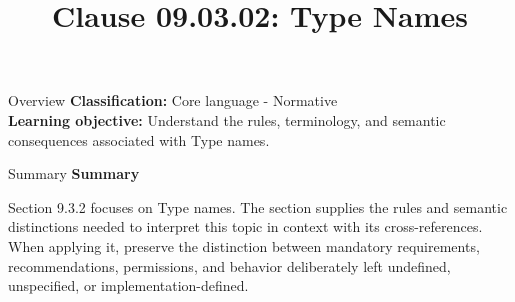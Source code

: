 \documentclass[10pt,letterpaper]{article}
\title{Clause 09.03.02: Type Names}
\author{}
\date{}
\begin{document}
\maketitle
\begin{CornellOverviewBox}{Overview}
\textbf{Classification:} Core language - Normative\\[2pt]
\textbf{Learning objective:} Understand the rules, terminology, and semantic consequences associated with Type names.
\end{CornellOverviewBox}\begin{CornellSummaryBox}{Summary}
{\sffamily\bfseries\color{Accent} Summary}\par\vspace{3pt}Section 9.3.2 focuses on Type names. The section supplies the rules and semantic distinctions needed to interpret this topic in context with its cross-references. When applying it, preserve the distinction between mandatory requirements, recommendations, permissions, and behavior deliberately left undefined, unspecified, or implementation-defined.
\end{CornellSummaryBox}
\end{document}
